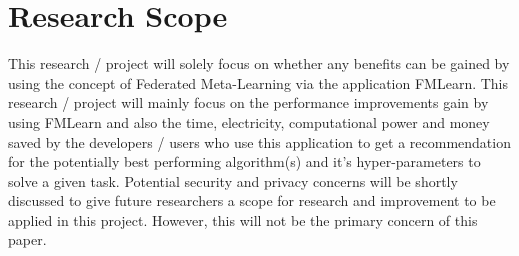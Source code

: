\section{Research Scope}
This research / project will solely focus on whether any benefits can be gained by using the concept of Federated Meta-Learning via the application FMLearn. This research / project will mainly focus on the performance improvements gain by using FMLearn and also the time, electricity, computational power and money saved by the developers / users who use this application to get a recommendation for the potentially best performing algorithm(s) and it's hyper-parameters to solve a given task. Potential security and privacy concerns will be shortly discussed to give future researchers a scope for research and improvement to be applied in this project. However, this will not be the primary concern of this paper.

\fi